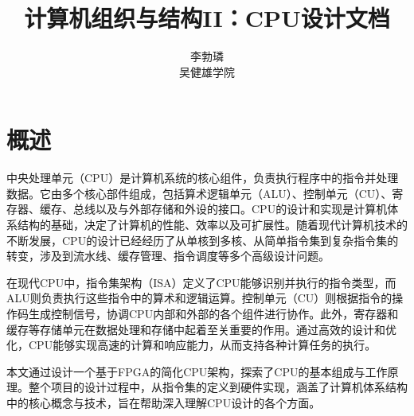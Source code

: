 \documentclass[lang=cn,a4paper,newtx]{elegantpaper}
\title{计算机组织与结构II：CPU设计文档}
\author{李勃璘 \\ 吴健雄学院}
\date{\zhdate{2025/5/6}}
\begin{document}
\maketitle
\thispagestyle{empty}
\begin{abstract}

\end{abstract}








\newpage
{}
\tableofcontents
\newpage
\listoftables
\newpage
{}
\section{概述}
中央处理单元（CPU）是计算机系统的核心组件，负责执行程序中的指令并处理数据。它由多个核心部件组成，包括算术逻辑单元（ALU）、控制单元（CU）、寄存器、缓存、总线以及与外部存储和外设的接口。CPU的设计和实现是计算机体系结构的基础，决定了计算机的性能、效率以及可扩展性。随着现代计算机技术的不断发展，CPU的设计已经经历了从单核到多核、从简单指令集到复杂指令集的转变，涉及到流水线、缓存管理、指令调度等多个高级设计问题。

在现代CPU中，指令集架构（ISA）定义了CPU能够识别并执行的指令类型，而ALU则负责执行这些指令中的算术和逻辑运算。控制单元（CU）则根据指令的操作码生成控制信号，协调CPU内部和外部的各个组件进行协作。此外，寄存器和缓存等存储单元在数据处理和存储中起着至关重要的作用。通过高效的设计和优化，CPU能够实现高速的计算和响应能力，从而支持各种计算任务的执行。

本文通过设计一个基于FPGA的简化CPU架构，探索了CPU的基本组成与工作原理。整个项目的设计过程中，从指令集的定义到硬件实现，涵盖了计算机体系结构中的核心概念与技术，旨在帮助深入理解CPU设计的各个方面。
\end{document}
